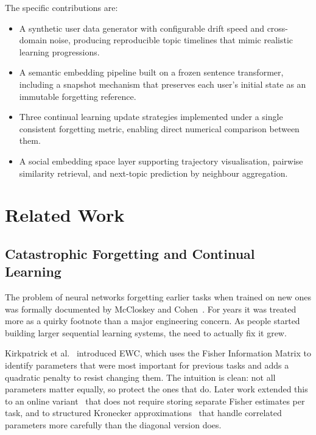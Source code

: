 \documentclass[conference]{IEEEtran}
\begin{document}
\smallskip
\noindent The specific contributions are:

\begin{itemize}
  \setlength\itemsep{2pt}

  \item A synthetic user data generator with configurable
        drift speed and cross-domain noise, producing
        reproducible topic timelines that mimic realistic
        learning progressions.

  \item A semantic embedding pipeline built on a frozen
        sentence transformer, including a snapshot mechanism
        that preserves each user's initial state as an
        immutable forgetting reference.

  \item Three continual learning update strategies
        implemented under a single consistent forgetting
        metric, enabling direct numerical comparison between
        them.

  \item A social embedding space layer supporting trajectory
        visualisation, pairwise similarity retrieval, and
        next-topic prediction by neighbour aggregation.

\end{itemize}

\section{Related Work}

\subsection{Catastrophic Forgetting and Continual Learning}

The problem of neural networks forgetting earlier tasks when
trained on new ones was formally documented by McCloskey and
Cohen~\cite{mccloskey1989}. For years it was treated more as
a quirky footnote than a major engineering concern. As people
started building larger sequential learning systems, the need
to actually fix it grew.

Kirkpatrick et al.~\cite{kirkpatrick2017} introduced EWC,
which uses the Fisher Information Matrix to identify parameters
that were most important for previous tasks and adds a
quadratic penalty to resist changing them. The intuition is
clean: not all parameters matter equally, so protect the ones
that do. Later work extended this to an online
variant~\cite{schwarz2018} that does not require storing
separate Fisher estimates per task, and to structured Kronecker
approximations~\cite{ritter2018} that handle correlated
parameters more carefully than the diagonal version does.
\end{document}
